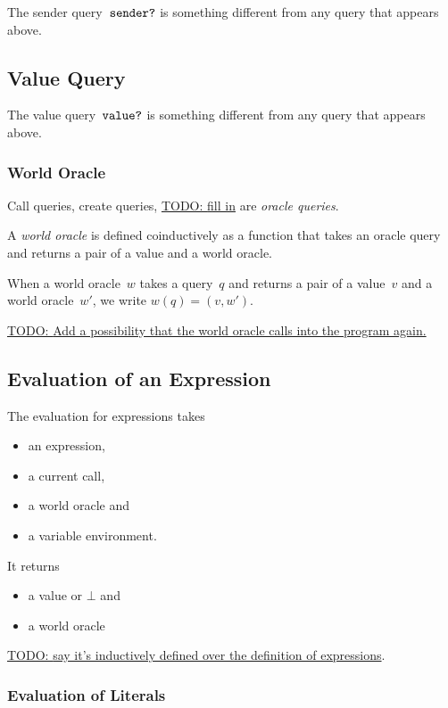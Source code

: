 \documentclass{book}
\newcommand{\todo}[1]{\underline{TODO: {#1}}}
\begin{document}
\newcommand{\senderQuery}{\text{\texttt{sender?}}}

The sender query~$\senderQuery$ is something different from any query that appears above.

\subsection{Value Query}

\newcommand{\valueQuery}{\text{\texttt{value?}}}

The value query~$\valueQuery$ is something different from any query that appears above.

\subsubsection{World Oracle}

Call queries, create queries, \todo{fill in} are \textit{oracle queries}.

A \textit{world oracle} is defined coinductively as a function that takes an oracle query and returns a pair of a value and a world oracle.

When a world oracle~$w$ takes a query~$q$ and returns a pair of a value~$v$ and a world oracle~$w'$, we write $w(q) = (v, w')$.

\todo{Add a possibility that the world oracle calls into the program again.}

\subsection{Evaluation of an Expression}

The evaluation for expressions takes
\begin{itemize}
\item an expression,
\item a current call,
\item a world oracle and
\item a variable environment.
\end{itemize}
It returns
\begin{itemize}
\item a value or $\bot$ and
\item a world oracle
\end{itemize}



\todo{say it's inductively defined over the definition of expressions}.

\subsubsection{Evaluation of Literals}
\end{document}
